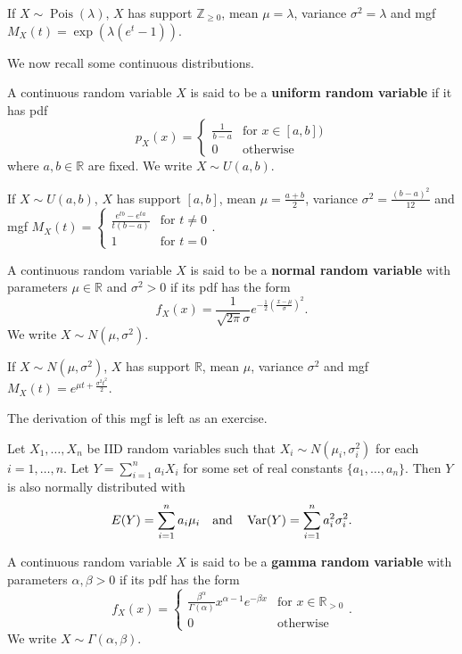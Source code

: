 If $X\sim \operatorname{Pois}(\lambda)$, $X$ has support $\mathbb Z_{\geq 0}$, mean $\mu=\lambda$, variance $\sigma^2=\lambda$ and mgf $M_X(t)=\exp(\lambda(e^t-1))$.

We now recall some continuous distributions.

\begin{definition}
	A continuous random variable $X$ is said to be a \textbf{uniform random variable} if it has pdf
	$$p_X(x)=\begin{cases}
		\frac{1}{b-a} & \text{for $x\in[a,b])$}\\
		0 & \text{otherwise}
	\end{cases}$$
	where $a,b\in\mathbb R$ are fixed. We write $X\sim U(a,b)$.
\end{definition}

If $X\sim U(a,b)$, $X$ has support $[a,b]$, mean $\mu=\frac{a+b}{2}$, variance $\sigma^2=\frac{(b-a)^2}{12}$ and mgf $M_X(t)=\begin{cases}
	\frac{e^{tb}-e^{ta}}{t(b-a)} & \text{for $t\neq 0$}\\
	1 & \text{for $t= 0$}
\end{cases}$.

\begin{definition}
	A continuous random variable $X$ is said to be a \textbf{normal random variable} with parameters $\mu\in\mathbb R$ and $\sigma^2>0$ if its pdf has the form
	$$f_X(x)=\frac{1}{\sqrt{2\pi}\sigma}e^{-\frac 12\left(\frac{x-\mu}{\sigma}\right)^2}.$$
	We write $X\sim N(\mu,\sigma^2)$.
\end{definition}

If $X\sim N(\mu,\sigma^2)$, $X$ has support $\mathbb R$, mean $\mu$, variance $\sigma^2$ and mgf $M_X(t)=e^{\mu t+\frac{\sigma^2 t^2}{2}}$.

The derivation of this mgf is left as an exercise.

\begin{theorem}[]
	Let $X_1,\hdots,X_n$ be IID random variables such that $X_i\sim N(\mu_i,\sigma_i^2)$ for each $i=1,\hdots,n$. Let $Y=\sum_{i=1}^na_iX_i$ for some set of real constants $\{a_1,\hdots,a_n\}$. Then $Y$ is also normally distributed with
$$E(Y)=\sum_{i=1}^na_i\mu_i\quad\text{and}\quad\operatorname{Var}(Y)=\sum_{i=1}^na_i^2\sigma_i^2.$$
\end{theorem}

\begin{definition}
	A continuous random variable $X$ is said to be a \textbf{gamma random variable} with parameters $\alpha,\beta>0$ if its pdf has the form
	$$f_X(x)=\begin{cases}
		\frac{\beta^\alpha}{\Gamma(\alpha)} x^{\alpha - 1} e^{-\beta x } & \text{for $x\in\mathbb R_{>0}$}\\
		0 & \text{otherwise}
	\end{cases}.$$
	We write $X\sim \Gamma(\alpha,\beta)$.
\end{definition}

